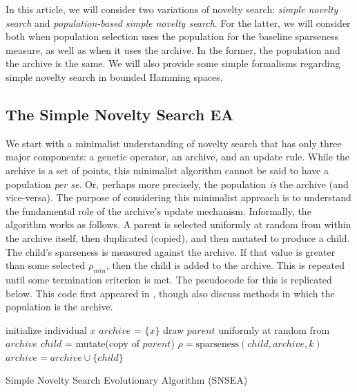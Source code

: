 \documentclass[twoside]{article}
\begin{document}
In this article, we will consider two variations of novelty search:  \emph{simple novelty search} and \emph{population-based simple novelty search}.  For the latter, we will consider both when population selection uses the population for the baseline sparseness measure, as well as when it uses the archive.   In the former, the population and the archive is the same.  We will also provide some simple formalisms regarding  simple novelty search in bounded Hamming spaces.

\subsection{The Simple Novelty Search EA}
\label{subsec:sns}

We start with a minimalist understanding of novelty search that has only three major components: a genetic operator, an archive, and an update rule.  While the archive is a set of points, this minimalist algorithm cannot be said to have a population \textit{per se}.  Or, perhaps more precisely, the population \emph{is} the archive (and vice-versa).  The purpose of considering this minimalist approach is to understand the fundamental role of the archive's update mechanism.  Informally, the algorithm works as follows. A parent is selected uniformly at random from within the archive itself, then duplicated (copied), and then mutated to produce a child. The child's sparseness is measured against the archive.  If that value is greater than some selected $\rho_{min}$, then the child is added to the archive.  This is repeated until some termination criterion is met.  The pseudocode for this is replicated below. This code first appeared in \citet{Wiegand2020flairs}, though \citet{CullyDemiris2017corr} also discuss methods in which the population is the archive.

\begin{algorithm}[ht]
  \SetAlgoLined
  \DontPrintSemicolon 
  
  \;
    
  initialize individual $x$\;
  $archive$ = $\{x\}$\;
   {
    draw $parent$ uniformly at random from $archive$\;
    $child$ = mutate(copy of $parent$)\;
    $\rho = \mbox{sparseness}(child, archive, k)$\;
     {
      $archive = archive \cup \{child\}$\;
     }
  }
  \caption{Simple Novelty Search Evolutionary Algorithm (SNSEA)}
\end{algorithm}
\end{document}
